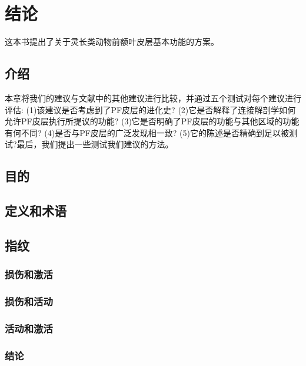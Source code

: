 \chapter{结论}
这本书提出了关于灵长类动物前额叶皮层基本功能的方案。

\section{介绍}
本章将我们的建议与文献中的其他建议进行比较，并通过五个测试对每个建议进行评估:
(1)该建议是否考虑到了PF皮层的进化史?
(2)它是否解释了连接解剖学如何允许PF皮层执行所提议的功能?
(3)它是否明确了PF皮层的功能与其他区域的功能有何不同?
(4)是否与PF皮层的广泛发现相一致?
(5)它的陈述是否精确到足以被测试?最后，我们提出一些测试我们建议的方法。
\section{目的}

\section{定义和术语}


\section{指纹}

\subsection{损伤和激活}

\subsection{损伤和活动}

\subsection{活动和激活}




\subsection{结论}



